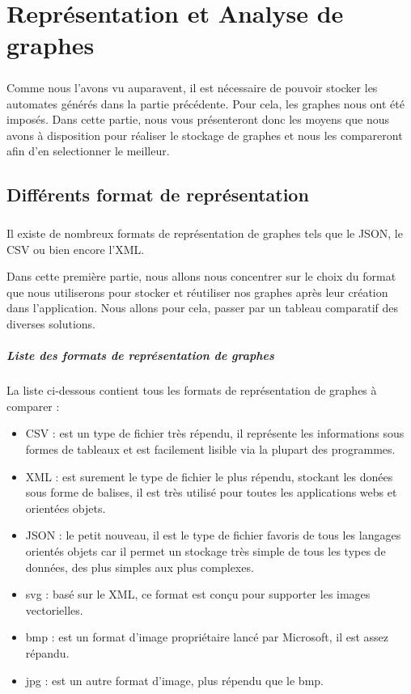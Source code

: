 \chapter{Représentation et Analyse de graphes}
\paragraph{}

Comme nous l'avons vu auparavent, il est nécessaire de pouvoir stocker les automates générés dans la partie précédente. Pour cela, les graphes nous ont été imposés. Dans cette partie, nous vous présenteront donc les moyens que nous avons à disposition pour réaliser le stockage de graphes et nous les compareront afin d'en selectionner le meilleur.

\section{Différents format de représentation}
  \paragraph{}
  Il existe de nombreux formats de représentation de graphes tels que le JSON, le CSV ou bien encore l'XML.
  
  Dans cette première partie, nous allons nous concentrer sur le choix du format que nous utiliserons pour stocker et réutiliser nos graphes après leur création dans l'application.
  Nous allons pour cela, passer par un tableau comparatif des diverses solutions.
  

  \paragraph{Liste des formats de représentation de graphes}
  La liste ci-dessous contient tous les formats de représentation de graphes à comparer : 
  \begin{itemize}
   \item CSV : est un type de fichier très répendu, il représente les informations sous formes de tableaux et est facilement lisible via la plupart des programmes. 
   \item XML : est surement le type de fichier le plus répendu, stockant les donées sous forme de balises, il est très utilisé pour toutes les applications webs et orientées objets. 
   \item JSON : le petit nouveau, il est le type de fichier favoris de tous les langages orientés objets car il permet un stockage très simple de tous les types de données, des plus simples aux plus complexes. 
   \item svg : basé sur le XML, ce format est conçu pour supporter les images vectorielles.
   \item bmp : est un format d'image propriétaire lancé par Microsoft, il est assez répandu.
   \item jpg : est un autre format d'image, plus répendu que le bmp.
  \end{itemize}

